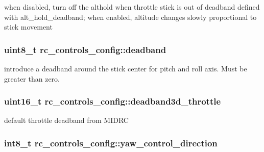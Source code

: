 when disabled, turn off the althold when throttle stick is out of deadband defined with alt\+\_\+hold\+\_\+deadband; when enabled, altitude changes slowly proportional to stick movement 

\hypertarget{structrc__controls__config_a64a198f55a884288e806aabef7dbb416}{
\subsubsection[{deadband}]{\setlength{\rightskip}{0pt plus 5cm}uint8\+\_\+t rc\+\_\+controls\+\_\+config\+::deadband}}\label{structrc__controls__config_a64a198f55a884288e806aabef7dbb416}


introduce a deadband around the stick center for pitch and roll axis. Must be greater than zero. 

\hypertarget{structrc__controls__config_a80d412104d96ef30ed53c042f153da6b}{
\subsubsection[{deadband3d\+\_\+throttle}]{\setlength{\rightskip}{0pt plus 5cm}uint16\+\_\+t rc\+\_\+controls\+\_\+config\+::deadband3d\+\_\+throttle}}\label{structrc__controls__config_a80d412104d96ef30ed53c042f153da6b}


default throttle deadband from M\+I\+D\+R\+C 

\hypertarget{structrc__controls__config_ad75b1c3890386c9bd1004a7ab39a384f}{
\subsubsection[{yaw\+\_\+control\+\_\+direction}]{\setlength{\rightskip}{0pt plus 5cm}int8\+\_\+t rc\+\_\+controls\+\_\+config\+::yaw\+\_\+control\+\_\+direction}}\label{structrc__controls__config_ad75b1c3890386c9bd1004a7ab39a384f}


